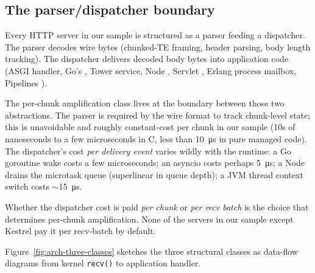 \subsection{The parser/dispatcher boundary}
\label{sec:rc-boundary}

Every HTTP server in our sample is structured as a parser feeding
a dispatcher. The parser decodes wire bytes (chunked-TE framing,
header parsing, body length tracking). The dispatcher delivers
decoded body bytes into application code (ASGI handler, Go's
, Tower service, Node ,
Servlet , Erlang process mailbox, Pipelines
).

The per-chunk amplification class lives at the boundary between
those two abstractions. The parser is required by the wire format
to track chunk-level state; this is unavoidable and roughly
constant-cost per chunk in our sample (10s of nanoseconds to a
few microseconds in C, less than \SI{10}{\micro\second} in pure
managed code). The dispatcher's cost \emph{per delivery event}
varies wildly with the runtime: a Go goroutine wake costs a few
microseconds; an asyncio  costs perhaps
\SI{5}{\micro\second}; a Node  drains the
microtask queue (superlinear in queue depth); a JVM thread
context switch costs $\sim$\SI{15}{\micro\second}.

Whether the dispatcher cost is paid \emph{per chunk} or
\emph{per recv batch} is the choice that determines per-chunk
amplification. None of the servers in our sample except Kestrel
pay it per recv-batch by default.

Figure~\ref{fig:arch-three-classes} sketches the three structural
classes as data-flow diagrams from kernel \texttt{recv()} to
application handler.


